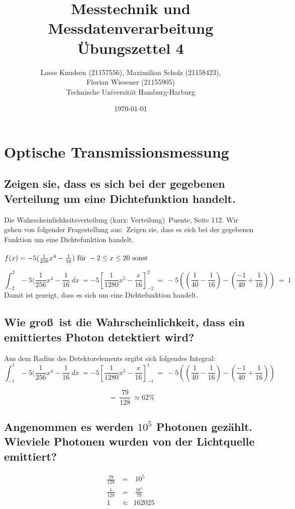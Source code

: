 \documentclass[12pt, a4paper, titlepage]{article}
\title{Messtechnik und Messdatenverarbeitung \\ \"Ubungszettel 4}
\author{Lasse Knudsen (21157556), Maximilian Scholz (21158423), \\
	Florian Wiesener (21155905)  \\
	Technische Universit\"at Hamburg-Harburg \\
}
\date{\today}
\begin{document}
	\maketitle
	 \section{ Optische Transmissionsmessung}
	 \label{sec:opti}
	 \subsection{Zeigen sie, dass es sich bei der gegebenen Verteilung um eine Dichtefunktion handelt.}
	\glqq Die Wahrscheinlichkeitsverteilung (kurz: Verteilung)\grqq \ Puente, Seite 112. Wir gehen von folgender Fragestellung aus:\ \glqq Zeigen sie, dass es sich bei der gegebenen Funktion um eine Dichtefunktion handelt\grqq . 
	\\
	\\
	$ f(x)  =  
	-5(\frac{1}{256} x^4 - \frac{1}{16}) \textmd{ f\"ur } -2 \leq x \leq 2\\
	\textmd{0 sonst}$


	 $$
	 \int_{-2}^2 -5(\frac{1}{256} x^4 - \frac{1}{16} \ dx \ = 
	 -5 \left[\frac{1}{1280}x^5-\frac{x}{16}\right]_{-2}^2 \ = 
	 \ -5\left(\left(\frac{1}{40}-\frac{1}{16}\right)-\left(\frac{-1}{40}+\frac{1}{16}\right)\right) \ = \ 1
	 $$
	 Damit ist gezeigt, dass es sich um eine Dichtefunktion handelt.
	 
	 \subsection{Wie gro\ss \ ist die Wahrscheinlichkeit, dass ein emittiertes Photon detektiert wird?}
	 Aus dem Radius des Detektorelements ergibt sich folgendes Integral:\\
	 $$
	 \int_{-1}^1 -5(\frac{1}{256} x^4 - \frac{1}{16} \ dx \ =
	 -5 \left[\frac{1}{1280}x^5-\frac{x}{16}\right]_{-1}^1 \ = 
	 \ -5\left(\left(\frac{1}{40}-\frac{1}{16}\right)-\left(\frac{-1}{40}+\frac{1}{16}\right)\right)$$ 
	 
	 
	 $$\ = \ 	\frac{79}{128}
	 \ \approx 62 \%
	 $$
	
	\subsection{Angenommen es werden $10^5$ Photonen gez\"ahlt. Wieviele Photonen wurden von der Lichtquelle emittiert?}
	\begin{eqnarray}
	\frac{79}{128} \ &=& \ 10^5 \\
	\frac{1}{128} \ &=& \ \frac{10^5}{79}\\
	1 \  \ & \approx & 162025
	\end{eqnarray}
\end{document}
